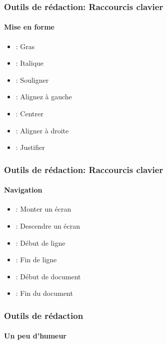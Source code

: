 \documentclass[xcolor=table]{beamer}
\begin{document}
\begin{frame}
\frametitle{Outils de rédaction: Raccourcis clavier}
\framesubtitle{Mise en forme}

\begin{itemize}
	\item {}: Gras
	\item {}: Italique
	\item {}: Souligner
	\item {}: Alignez à gauche
	\item {}: Centrer
	\item {}: Aligner à droite
	\item {}: Justifier 
\end{itemize}

\end{frame}

\begin{frame}
\frametitle{Outils de rédaction: Raccourcis clavier}
\framesubtitle{Navigation}

\begin{itemize}
	\item {}: Monter un écran
	\item {}: Descendre un écran
	\item {}: Début de ligne
	\item {}: Fin de ligne
	\item {}: Début de document
	\item {}: Fin du document 
\end{itemize}

\end{frame}

\begin{frame}
\frametitle{Outils de rédaction}
\framesubtitle{Un peu d'humeur}

\begin{center}
\end{center}

\end{frame}

\end{document}
